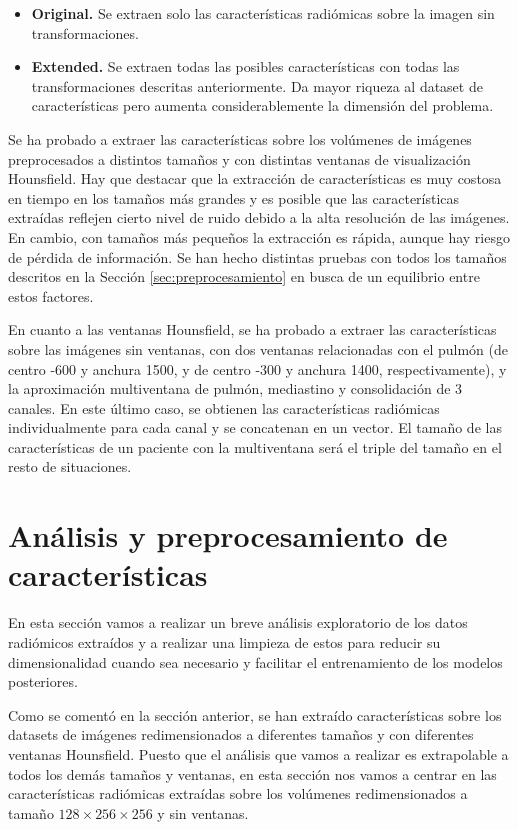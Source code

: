 \begin{itemize}
    \item \textbf{Original.} Se extraen solo las características radiómicas sobre la imagen sin transformaciones.
    \item \textbf{Extended.} Se extraen todas las posibles características con todas las transformaciones descritas anteriormente. Da mayor riqueza al dataset de características pero aumenta considerablemente la dimensión del problema.
\end{itemize}

Se ha probado a extraer las características sobre los volúmenes de imágenes preprocesados a distintos tamaños y con distintas ventanas de visualización Hounsfield. Hay que destacar que la extracción de características es muy costosa en tiempo en los tamaños más grandes y es posible que las características extraídas reflejen cierto nivel de ruido debido a la alta resolución de las imágenes. En cambio, con tamaños más pequeños la extracción es rápida, aunque hay riesgo de pérdida de información. Se han hecho distintas pruebas con todos los tamaños descritos en la Sección \ref{sec:preprocesamiento} en busca de un equilibrio entre estos factores.

En cuanto a las ventanas Hounsfield, se ha probado a extraer las características sobre las imágenes sin ventanas, con dos ventanas relacionadas con el pulmón (de centro -600 y anchura 1500, y de centro -300 y anchura 1400, respectivamente), y la aproximación multiventana de pulmón, mediastino y consolidación de 3 canales. En este último caso, se obtienen las características radiómicas individualmente para cada canal y se concatenan en un vector. El tamaño de las características de un paciente con la multiventana será el triple del tamaño en el resto de situaciones. 

\section{Análisis y preprocesamiento de características}

En esta sección vamos a realizar un breve análisis exploratorio de los datos radiómicos extraídos y a realizar una limpieza de estos para reducir su dimensionalidad cuando sea necesario y facilitar el entrenamiento de los modelos posteriores.

Como se comentó en la sección anterior, se han extraído características sobre los datasets de imágenes redimensionados a diferentes tamaños y con diferentes ventanas Hounsfield. Puesto que el análisis que vamos a realizar es extrapolable a todos los demás tamaños y ventanas, en esta sección nos vamos a centrar en las características radiómicas extraídas sobre los volúmenes redimensionados a tamaño $128 \times 256 \times 256$ y sin ventanas.

